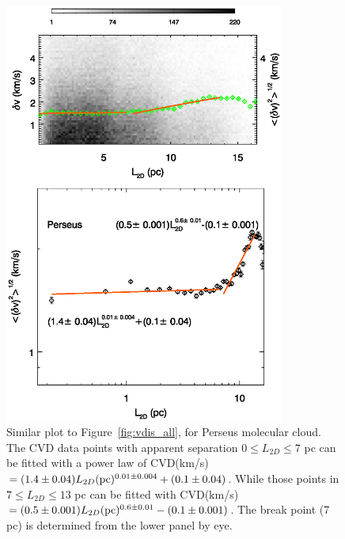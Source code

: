 \documentclass[iop,revtex4]{emulateapj}
\begin{document}
\begin{figure}[htbp]
\begin{minipage}[b]{0.45\textwidth}
  \includegraphics[width=9.2cm]{pera_vdis_all_all.eps}
\end{minipage}
\caption{Similar plot to Figure~\ref{fig:vdis_all}, for Perseus molecular cloud. The CVD data points with apparent separation $0\leq L_{2D} \leq 7$  pc can be fitted with a power law of CVD(km/s)$=(1.4\pm 0.04)L_{2D} ({\rm pc})^{0.01\pm 0.004}+(0.1\pm 0.04)$. While those points in $7\leq L_{2D} \leq 13$  pc can be fitted with CVD(km/s)$=(0.5\pm 0.001)L_{2D} ({\rm pc})^{0.6\pm 0.01}-(0.1\pm 0.001)$. The break point (7 pc) is determined from the lower panel by eye.}\label{fig:pera_vdis_all}
\end{figure}
\end{document}

